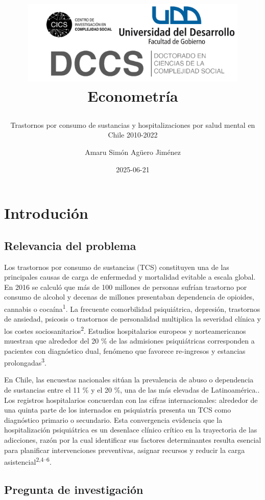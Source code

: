 \documentclass[
  spanish,
  10pt,
]{article}
\title{\begin{center}
  \includegraphics[height=4cm]{logo.png} \\[1cm]
  \Large Econometría \\
\end{center}}
\subtitle{Trastornos por consumo de sustancias y hospitalizaciones por
salud mental en Chile 2010-2022}
\author{Amaru Simón Agüero Jiménez}
\date{2025-06-21}
\renewcommand*\contentsname{Tabla de contenidos}
\newcommand\contentsname{Tabla de contenidos}
\begin{document}
\maketitle

\renewcommand*\contentsname{Tabla de contenidos}
{
\hypersetup{linkcolor=}
\setcounter{tocdepth}{3}
\tableofcontents
}

\newpage

\section{Introdución}\label{introduciuxf3n}

\subsection{Relevancia del problema}\label{relevancia-del-problema}

Los trastornos por consumo de sustancias (TCS) constituyen una de las
principales causas de carga de enfermedad y mortalidad evitable a escala
global. En 2016 se calculó que más de 100 millones de personas sufrían
trastorno por consumo de alcohol y decenas de millones presentaban
dependencia de opioides, cannabis o cocaína\textsuperscript{1}. La
frecuente comorbilidad psiquiátrica, depresión, trastornos de ansiedad,
psicosis o trastornos de personalidad multiplica la severidad clínica y
los costes sociosanitarios\textsuperscript{2}. Estudios hospitalarios
europeos y norteamericanos muestran que alrededor del 20 \% de las
admisiones psiquiátricas corresponden a pacientes con diagnóstico dual,
fenómeno que favorece re-ingresos y estancias
prolongadas\textsuperscript{3}.

En Chile, las encuestas nacionales sitúan la prevalencia de abuso o
dependencia de sustancias entre el 11 \% y el 20 \%, una de las más
elevadas de Latinoamérica.. Los registros hospitalarios concuerdan con
las cifras internacionales: alrededor de una quinta parte de los
internados en psiquiatría presenta un TCS como diagnóstico primario o
secundario. Esta convergencia evidencia que la hospitalización
psiquiátrica es un desenlace clínico crítico en la trayectoria de las
adicciones, razón por la cual identificar sus factores determinantes
resulta esencial para planificar intervenciones preventivas, asignar
recursos y reducir la carga asistencial\textsuperscript{2,4--6}.

\subsection{Pregunta de
investigación}\label{pregunta-de-investigaciuxf3n}
\end{document}
